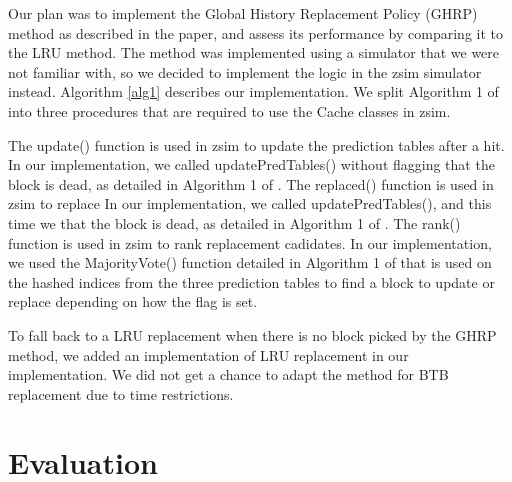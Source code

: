 \documentclass[11pt]{article}
\begin{document}
Our plan was to implement the Global History Replacement Policy (GHRP) method as described in the paper, and assess its performance by comparing it to the LRU method.
The method was implemented using a simulator that we were not familiar with, so we decided to implement the logic in the zsim simulator instead.
Algorithm \ref{alg1} describes our implementation. We split Algorithm 1 of \cite{samira-ISCA18} into three procedures that are required to use the Cache classes in zsim.\par

The update() function is used in zsim to update the prediction tables after a hit. In our implementation, we called updatePredTables() without flagging that the block is dead, as detailed in Algorithm 1 of \cite{samira-ISCA18}. 
The replaced() function is used in zsim to replace In our implementation, we called updatePredTables(), and this time we that the block is dead, as detailed in Algorithm 1 of \cite{samira-ISCA18}.
The rank() function is used in zsim to rank replacement cadidates. In our implementation, we used the MajorityVote() function detailed in Algorithm 1 of \cite{samira-ISCA18} that is used on the hashed indices from the three prediction tables to find a block to update or replace depending on how the flag is set.\par

To fall back to a LRU replacement when there is no block picked by the GHRP method, we added an implementation of LRU replacement in our implementation.
We did not get a chance to adapt the method for BTB replacement due to time restrictions.
	\begin{algorithmic}[1]
		\renewcommand{\algorithmicrequire}{\textbf{Input: PC}}
		\EndProcedure
		\EndProcedure
		\EndProcedure
	\end{algorithmic}

\section{Evaluation}
\label{sec:Evaluation}
\end{document}
